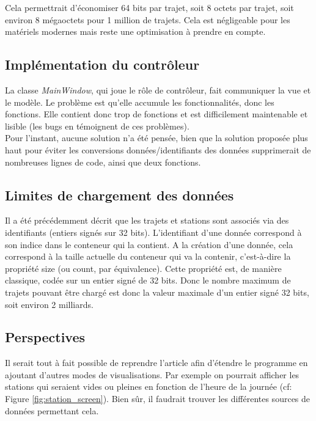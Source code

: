 \documentclass[12pt]{article}
\begin{document}
		Cela permettrait d’économiser 64 bits par trajet, soit 8 octets par trajet, soit environ 8 mégaoctets pour 1 million de trajets. Cela est négligeable pour les matériels modernes mais reste une optimisation à prendre en compte.		
		
		
		\subsection{Implémentation du contrôleur}
		La classe \textit{MainWindow}, qui joue le rôle de contrôleur, fait communiquer la vue et le modèle. Le problème est qu’elle accumule les fonctionnalités, donc les fonctions. Elle contient donc trop de fonctions et est difficilement maintenable et lisible (les bugs en témoignent de ces problèmes).\\
	
		Pour l’instant, aucune solution n’a été pensée, bien que la solution proposée plus haut pour éviter les conversions données/identifiants des données supprimerait de nombreuses lignes de code, ainsi que deux fonctions.
		
		\subsection{Limites de chargement des données}
		Il a été précédemment décrit que les trajets et stations sont associés via des identifiants (entiers signés sur 32 bits). L’identifiant d’une donnée correspond à son indice dans le conteneur qui la contient. A la création d’une donnée, cela correspond à la taille actuelle du conteneur qui va la contenir, c’est-à-dire la propriété size (ou count, par équivalence). Cette propriété est, de manière classique, codée sur un entier signé de 32 bits. Donc le nombre maximum de trajets pouvant être chargé est donc la valeur maximale d'un entier signé 32 bits, soit environ 2 milliards.		
		
		\subsection{Perspectives}
		Il serait tout à fait possible de reprendre l'article \cite{Oli16} afin d’étendre le programme
		en ajoutant d'autres modes de visualisations. Par exemple on pourrait afficher les stations
		qui seraient vides ou pleines en fonction de l'heure de la journée (cf: Figure
		\ref{fig:station_screen}). Bien sûr, il faudrait
		trouver	les différentes sources de données permettant cela.
	
	\newpage
\end{document}
